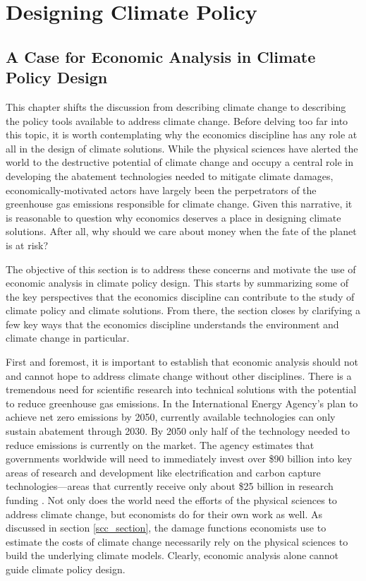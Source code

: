 \section{Designing Climate Policy}

\subsection{A Case for Economic Analysis in Climate Policy Design \label{2.1}}

This chapter shifts the discussion from describing climate change to describing the policy tools available to address climate change. Before delving too far into this topic, it is worth contemplating why the economics discipline has any role at all in the design of climate solutions. While the physical sciences have alerted the world to the destructive potential of climate change and occupy a central role in developing the abatement technologies needed to mitigate climate damages, economically-motivated actors have largely been the perpetrators of the greenhouse gas emissions responsible for climate change. Given this narrative, it is reasonable to question why economics deserves a place in designing climate solutions.  After all, why should we care about money when the fate of the planet is at risk?

The objective of this section is to address these concerns and motivate the use of economic analysis in climate policy design.  This starts by summarizing some of the key perspectives that the economics discipline can contribute to the study of climate policy and climate solutions. From there, the section closes by clarifying a few key ways that the economics discipline understands the environment and climate change in particular. 

First and foremost, it is important to establish that economic analysis should not and cannot hope to address climate change without other disciplines. There is a tremendous need for scientific research into technical solutions with the potential to reduce greenhouse gas emissions. In the International Energy Agency's plan to achieve net zero emissions by 2050, currently available technologies can only sustain abatement through 2030. By 2050 only half of the technology needed to reduce emissions is currently on the market. The agency estimates that governments worldwide will need to immediately invest over \$90 billion into key areas of research and development like electrification and carbon capture technologies---areas that currently receive only about \$25 billion in research funding \citep{ieareport}. Not only does the world need the efforts of the physical sciences to address climate change, but economists do for their own work as well. As discussed in section \ref{scc_section}, the damage functions economists use to estimate the costs of climate change necessarily rely on the physical sciences to build the underlying climate models. Clearly, economic analysis alone cannot guide climate policy design. 

